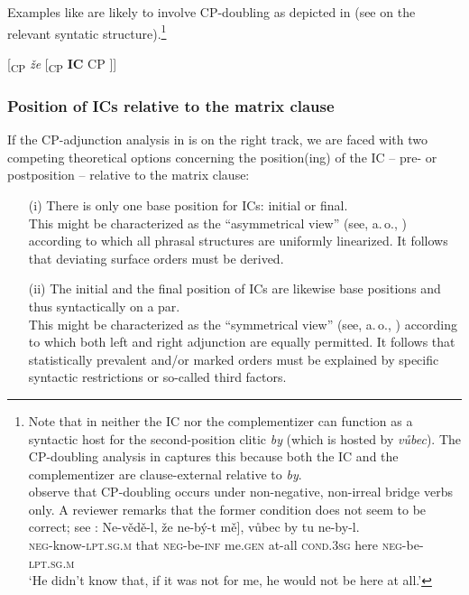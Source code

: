 \documentclass[output=paper,colorlinks,citecolor=brown,
modfonts,newtxmath
]{langscibook}
\begin{document}
\noindent Examples like  are likely to involve CP-doubling as depicted in  (see \citealt{Kaspar2016} on the relevant syntatic structure).\footnote{Note that in  neither the IC nor the complementizer can function as a syntactic host for the second-position clitic \textit{by} (which is hosted by \textit{vůbec}). The CP-doubling analysis in  captures this because both the IC and the complementizer are clause-external relative to \textit{by}.\\ \citet{IatridouKroch1992} observe that CP-doubling occurs under non-negative, non-irreal bridge verbs only. A reviewer remarks that the former condition does not seem to be correct; see : 
\ea\label{ex:reviewer}
\gll Ne-vědě-l, že \minsp{[} ne-bý-t mě], vůbec by tu ne-by-l.\\ 
     \textsc{neg}-know-\textsc{lpt.sg.m} that {} \textsc{neg}-be-\textsc{inf} me.\textsc{gen} at-all \textsc{cond.3sg} here \textsc{neg}-be-\textsc{lpt.sg.m}\\
\glt `He didn't know that, if it was not for me, he would not be here at all.'
\z}

\ea\label{tree:CPdoubling}
{[\textsubscript{CP} \textit{že} [\textsubscript{CP} \textbf{IC} CP ]]}
\z


\subsubsection{Position of ICs relative to the matrix clause}\label{sec:syntax_external_position}

If the CP-adjunction analysis in  is on the right track, we are faced with two competing theoretical options concerning the position(ing) of the IC -- pre- or postposition -- relative to the matrix clause:

\begin{itemize}

\item[(i)] There is only one base position for ICs: initial or final.\\ This might be characterized as the ``asymmetrical view'' (see, a.\,o., \citealt{Kayne1994}) according to which all phrasal structures are uniformly linearized. It follows that deviating surface orders must be derived.

\item[(ii)] The initial and the final position of ICs are likewise base positions and thus syntactically on a par.\\ This might be characterized as the ``symmetrical view'' (see, a.\,o., \citealt{Chomsky1986,Chomsky2004}) according to which both left and right adjunction are equally permitted. It follows that statistically prevalent and/or marked orders must be explained by specific syntactic restrictions or so-called third factors.

\end{itemize}
\end{document}
